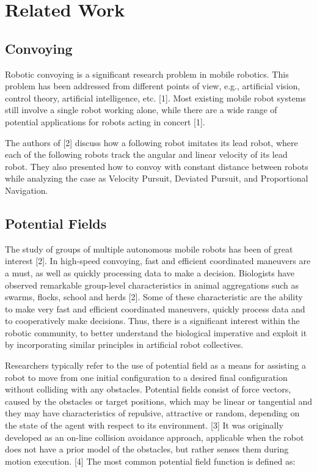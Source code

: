 \section{Related Work}
\subsection{Convoying}
Robotic convoying is a significant research problem in mobile robotics. This problem has been addressed from different points of view, e.g., artificial vision, control theory, artificial intelligence, etc. [1]. Most existing mobile robot systems still involve a single robot working alone, while there are a wide range of potential applications for robots acting in concert [1]. 

The authors of [2] discuss how a following robot imitates its lead robot, where each of the following robots track the angular and linear velocity of its lead robot. They also presented how to convoy with constant distance between robots while analyzing the case as Velocity Pursuit, Deviated Pursuit, and Proportional Navigation.

\subsection{Potential Fields}
The study of groups of multiple autonomous mobile robots has been of great interest [2]. In high-speed convoying, fast and efficient coordinated maneuvers are a must, as well as quickly processing data to make a decision. Biologists have observed remarkable group-level characteristics in animal aggregations such as swarms, flocks, school and herds [2]. Some of these characteristic are the ability to make very fast and efficient coordinated maneuvers, quickly process data and to cooperatively make decisions. Thus, there is a significant interest within the robotic community, to better understand the biological imperative and exploit it by incorporating similar principles in artificial robot collectives.  

Researchers typically refer to the use of potential field as a means for assisting a robot to move from one initial configuration to a desired final configuration without colliding with any obstacles. Potential fields consist of force vectors, caused by the obstacles or target positions, which may be linear or tangential and they may have characteristics of repulsive, attractive or random, depending on the state of the agent with respect to its environment. [3] It was originally developed as an on-line collision avoidance approach, applicable when the robot does not have a prior model of the obstacles, but rather senses them during motion execution. [4] The most common potential field function is defined as:

